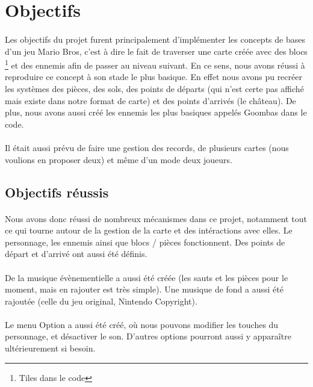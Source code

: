 ﻿\section{Objectifs}

\paragraph{} Les objectifs du projet furent principalement d'implémenter les concepts de bases d'un jeu Mario Bros, c'est à dire le fait de traverser une carte créée avec des blocs \footnote{Tiles dans le code} et des ennemis afin de passer au niveau suivant. En ce sens, nous avons réussi à reproduire ce concept à son stade le plus basique. En effet nous avons pu recréer les systèmes des pièces, des sols, des points de départs (qui n'est certe pas affiché mais existe dans notre format de carte) et des points d'arrivés (le château). De plus, nous avons aussi créé les ennemis les plus basiques appelés Goombas dans le code.

\paragraph{} Il était aussi prévu de faire une gestion des records, de plusieurs cartes (nous voulions en proposer deux) et même d'un mode deux joueurs.

\subsection{Objectifs réussis}

\paragraph{} Nous avons donc réussi de nombreux mécanismes dans ce projet, notamment tout ce qui tourne autour de la gestion de la carte et des intéractions avec elles. Le personnage, les ennemis ainsi que blocs / pièces fonctionnent. Des points de départ et d'arrivé ont aussi été définis.
\paragraph{} De la musique évènementielle a aussi été créée (les sauts et les pièces pour le moment, mais en rajouter est très simple). Une musique de fond a aussi été rajoutée (celle du jeu original, Nintendo Copyright).
\paragraph{} Le menu Option a aussi été créé, où nous pouvons modifier les touches du personnage, et désactiver le son. D'autres options pourront aussi y apparaître ultérieurement si besoin.


